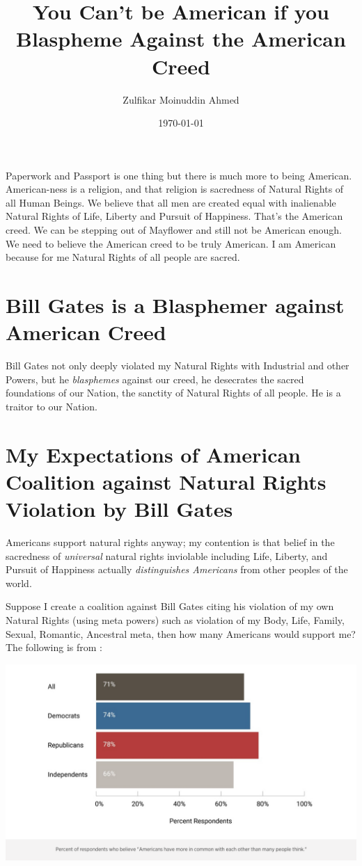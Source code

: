 \documentclass{amsart}
\title{You Can't be American if you Blaspheme Against the American Creed}
\author{Zulfikar Moinuddin Ahmed}
\date{\today}
\begin{document}
\maketitle

Paperwork and Passport is one thing but there is much more to being American.  American-ness is a religion, and that religion is sacredness of Natural Rights of all Human Beings.  We believe that all men are created equal with inalienable Natural Rights of Life, Liberty and Pursuit of Happiness.  That's the American creed.  We can be stepping out of Mayflower and still not be American enough.  We need to believe the American creed to be truly American.  I am American because for me Natural Rights of all people are sacred.  

\section{Bill Gates is a Blasphemer against American Creed}

Bill Gates not only deeply violated my Natural Rights with Industrial and other Powers, but he {\em blasphemes} against our creed, he desecrates the sacred foundations of our Nation, the sanctity of Natural Rights of all people.  He is a traitor to our Nation.

\section{My Expectations of American Coalition against Natural Rights Violation by Bill Gates}

Americans support natural rights anyway; my contention is that belief in the sacredness of {\em universal} natural rights inviolable including Life, Liberty, and Pursuit of Happiness actually {\em distinguishes Americans} from other peoples of the world. 

Suppose I create a coalition against Bill Gates citing his violation of my own Natural Rights (using meta powers) such as violation of my Body, Life, Family, Sexual, Romantic, Ancestral meta, then how many Americans would support me?  The following is from \cite{AR}:

\includegraphics[scale=0.2]{amrights.png}
\end{document}
